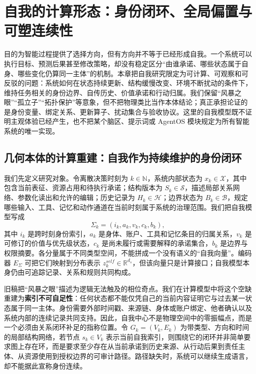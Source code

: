 \chapter{自我的计算形态：身份闭环、全局偏置与可塑连续性}
\label{chp:self_holomorphic}

目的为智能过程提供了选择方向，但有方向并不等于已经形成自我。一个系统可以执行目标、预测后果甚至修改策略，却没有稳定区分“由谁承诺、哪些状态属于自身、哪些变化仍算同一主体”的机制。本章把自我研究限定为可计算、可观察和可反驳的问题：系统如何在状态持续更新、结构缓慢改变、环境不断扰动的条件下，维持任务相关的身份边界、自传历史、价值承诺和行动归属。我们保留“风暴之眼”“孤立子”“拓扑保护”等意象，但不把物理类比当作本体结论；真正承担论证的是身份变量、绑定关系、更新算子、扰动集合与验收协议。这里的自我模型既不证明主观体验已经产生，也不把某个脑区、提示词或 AgentOS 模块规定为所有智能系统的唯一实现。

\section{几何本体的计算重建：自我作为持续维护的身份闭环}
\label{sec:geometric_ontology_self}

我们先定义研究对象。令离散决策时刻为 $k\in\mathbb{N}$，系统内部状态为 $x_k\in\mathcal{X}$，其中包含当前表征、资源占用和待执行承诺；结构版本为 $S_k\in\mathcal{S}$，描述局部关系网络、参数化读出和允许的编辑；历史记录为 $H_k\in\mathcal{H}$；边界状态为 $B_k\in\mathcal{B}$，规定哪些输入、工具、记忆和动作通道在当前时刻属于系统的治理范围。我们把自我模型写成
\[
\Sigma_k=(i_k,a_k,v_k,c_k,b_k),
\]
其中 $i_k$ 是跨时刻身份索引，$a_k$ 是身体、账户、工具和记忆条目的归属关系，$v_k$ 是可修订的价值与优先级状态，$c_k$ 是尚未履行或需要解释的承诺集合，$b_k$ 是边界与权限摘要。各分量属于不同类型空间，不能拼成一个没有语义的“自我向量”。编码器 $E_{\Sigma}$ 可把它们映射到分布表示 $z_k^{self}\in\mathbb{R}^{d_s}$，但该向量只是计算接口；自我模型本身仍由可追踪记录、关系和规则共同构成。

旧稿把“风暴之眼”描述为逻辑无法触及的相位奇点。我们在计算模型中将这个空缺重建为\textbf{索引不可自足性}：任何状态都不能仅凭自己的当前内容证明它与过去某一状态属于同一主体。身份需要外部时间戳、来源链、身体或账户绑定、他者确认以及系统内部的连续记录共同支持。因此，自我中心不是物理空间中的零振幅点，而是一个必须由关系闭环补足的指称位置。令 $G_k=(V_k,E_k)$ 为带类型、方向和时间的局部结构网络，若节点 $s_k\in V_k$ 表示当前自我索引，则围绕它的闭环并非简单要求图上存在环，而是要求至少存在从当前承诺到历史来源、从行动后果到责任主体、从资源使用到授权边界的可审计路径。路径缺失时，系统可以继续生成语言，却不能据此宣称身份连续。

